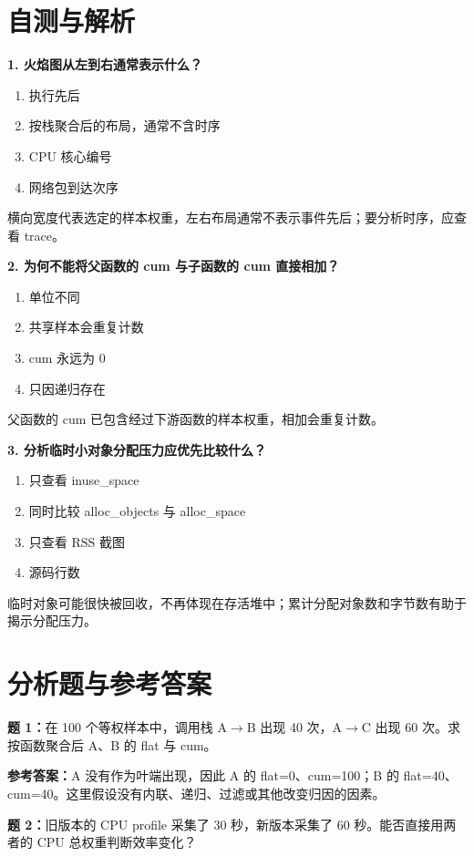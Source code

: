 \documentclass[UTF8,fontset=fandol,openany,11pt]{ctexbook}
\begin{document}
\section{自测与解析}
\noindent\textbf{1. 火焰图从左到右通常表示什么？}
\begin{enumerate}[label=\Alph*.]
\item 执行先后
\item 按栈聚合后的布局，通常不含时序
\item CPU 核心编号
\item 网络包到达次序
\end{enumerate}
横向宽度代表选定的样本权重，左右布局通常不表示事件先后；要分析时序，应查看 trace。

\noindent\textbf{2. 为何不能将父函数的 cum 与子函数的 cum 直接相加？}
\begin{enumerate}[label=\Alph*.]
\item 单位不同
\item 共享样本会重复计数
\item cum 永远为 0
\item 只因递归存在
\end{enumerate}
父函数的 cum 已包含经过下游函数的样本权重，相加会重复计数。

\noindent\textbf{3. 分析临时小对象分配压力应优先比较什么？}
\begin{enumerate}[label=\Alph*.]
\item 只查看 inuse\_space
\item 同时比较 alloc\_objects 与 alloc\_space
\item 只查看 RSS 截图
\item 源码行数
\end{enumerate}
临时对象可能很快被回收，不再体现在存活堆中；累计分配对象数和字节数有助于揭示分配压力。

\section{分析题与参考答案}
\noindent\textbf{题 1：}在 100 个等权样本中，调用栈 A\ensuremath{\rightarrow}\allowbreak{}B 出现 40 次，A\ensuremath{\rightarrow}\allowbreak{}C 出现 60 次。求按函数聚合后 A、B 的 flat 与 cum。

\noindent\textbf{参考答案：}A 没有作为叶端出现，因此 A 的 flat=0、cum=100；B 的 flat=40、cum=40。这里假设没有内联、递归、过滤或其他改变归因的因素。

\noindent\textbf{题 2：}旧版本的 CPU profile 采集了 30 秒，新版本采集了 60 秒。能否直接用两者的 CPU 总权重判断效率变化？
\end{document}
